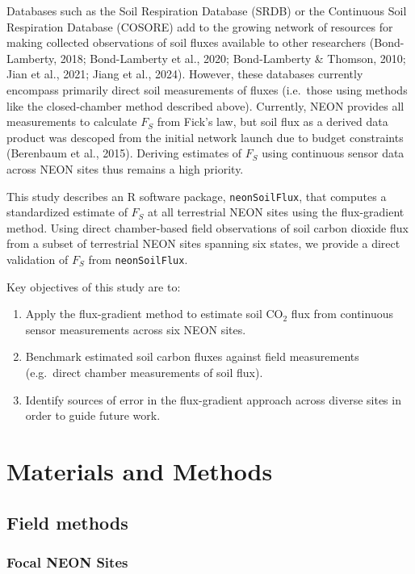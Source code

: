 \documentclass[
  letterpaper,
  DIV=11,
  numbers=noendperiod]{scrartcl}
\providecommand{\tightlist}{%
  \setlength{\itemsep}{0pt}\setlength{\parskip}{0pt}}\usepackage{longtable,booktabs,array}
\begin{document}
Databases such as the Soil Respiration Database (SRDB) or the Continuous
Soil Respiration Database (COSORE) add to the growing network of
resources for making collected observations of soil fluxes available to
other researchers (Bond-Lamberty, 2018; Bond-Lamberty et al., 2020;
Bond-Lamberty \& Thomson, 2010; Jian et al., 2021; Jiang et al., 2024).
However, these databases currently encompass primarily direct soil
measurements of fluxes (i.e.~those using methods like the closed-chamber
method described above). Currently, NEON provides all measurements to
calculate \(F_{S}\) from Fick's law, but soil flux as a derived data
product was descoped from the initial network launch due to budget
constraints (Berenbaum et al., 2015). Deriving estimates of \(F_{S}\)
using continuous sensor data across NEON sites thus remains a high
priority.

This study describes an R software package, \texttt{neonSoilFlux}, that
computes a standardized estimate of \(F_{S}\) at all terrestrial NEON
sites using the flux-gradient method. Using direct chamber-based field
observations of soil carbon dioxide flux from a subset of terrestrial
NEON sites spanning six states, we provide a direct validation of
\(F_{S}\) from \texttt{neonSoilFlux}.

Key objectives of this study are to:

\begin{enumerate}
\def\labelenumi{\arabic{enumi}.}
\tightlist
\item
  Apply the flux-gradient method to estimate soil CO\(_{2}\) flux from
  continuous sensor measurements across six NEON sites.
\item
  Benchmark estimated soil carbon fluxes against field measurements
  (e.g.~direct chamber measurements of soil flux).
\item
  Identify sources of error in the flux-gradient approach across diverse
  sites in order to guide future work.
\end{enumerate}

\section{Materials and Methods}\label{materials-and-methods}

\subsection{Field methods}\label{field-methods}

\subsubsection{Focal NEON Sites}\label{focal-neon-sites}
\end{document}
